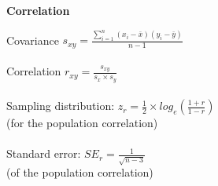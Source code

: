 \begin{minipage}[t]{.45\textwidth}
\begin{center}
    \textbf{Correlation}
\end{center}
\hline
\answerskip
Covariance \hfill $s_{xy} = \frac{\sum^n_{i = 1} (x_i - \bar{x})(y_i - \bar{y})}{n - 1}$\\
\\
Correlation \hfill $r_{xy} = \frac{s_{xy}}{s_x \times s_y}$ \\
\\
Sampling distribution: \hfill $z_r = \frac{1}{2} \times log_e (\frac{1 + r}{1 - r})$\\
{\scriptsize (for the population correlation)} \\
\\
Standard error: \hfill $SE_r = \frac{1}{\sqrt{n - 3}}$\\
{\scriptsize (of the population correlation)} \\
\\
\end{minipage}

\clearpage %

